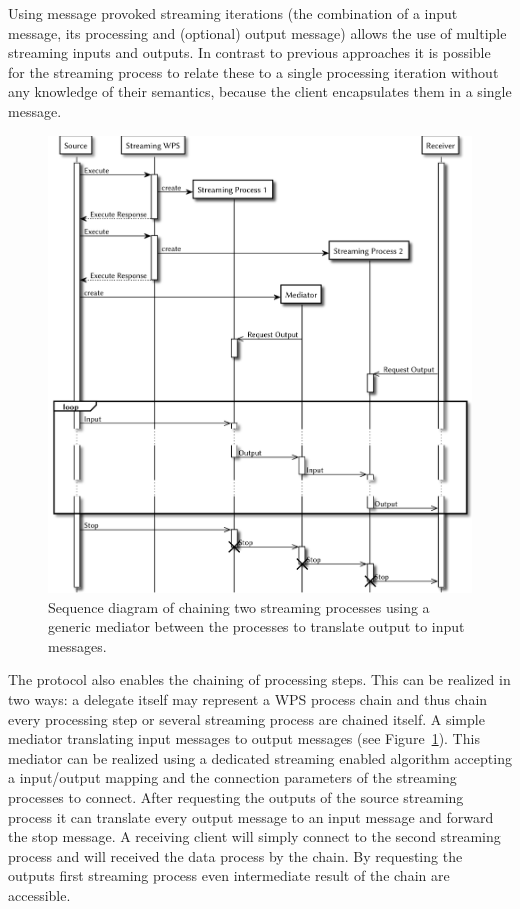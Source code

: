 		Using message provoked streaming iterations (the combination of a input message, its processing and (optional) output message) allows the use of multiple streaming inputs and outputs. In contrast to previous approaches it is possible for the streaming process to relate these to a single processing iteration without any knowledge of their semantics, because the client encapsulates them in a single message.

		\begin{figure}[!htb]
			\centering
			\includegraphics[width=\textwidth]{figures/sequence-diagramm-chain.pdf} %
			\caption{\label{fig:sd:chain} Sequence diagram of chaining two streaming processes using a generic mediator between the processes to translate output to input messages.}
		\end{figure}

		The protocol also enables the chaining of processing steps. This can be realized in two ways: a delegate itself may represent a \ac{WPS} process chain and thus chain every processing step or several streaming process are chained itself. A simple mediator translating input messages to output messages (see Figure~\ref{fig:sd:chain}). This mediator can be realized using a dedicated streaming enabled algorithm accepting a input/output mapping and the connection parameters of the streaming processes to connect. After requesting the outputs of the source streaming process it can translate every output message to an input message and forward the stop message. A receiving client will simply connect to the second streaming process and will received the data process by the chain. By requesting the outputs first streaming process even intermediate result of the chain are accessible.

